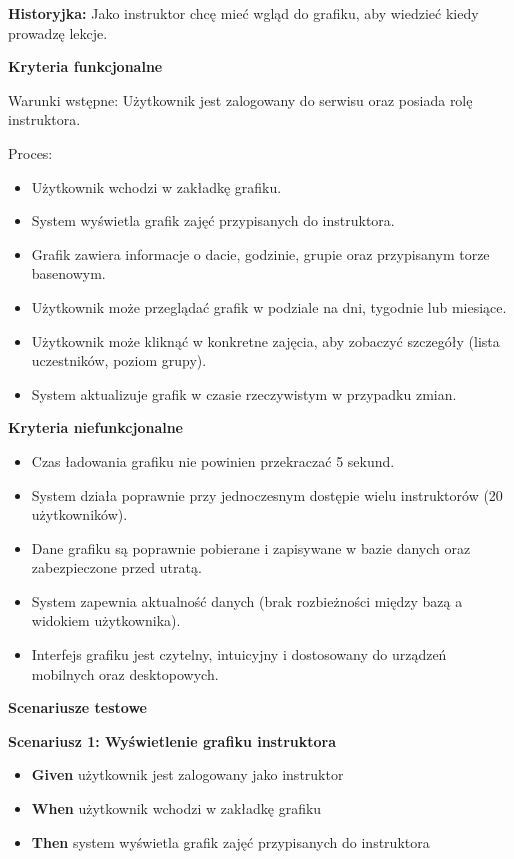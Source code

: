 \documentclass[a4paper,12pt]{article}
\begin{document}
\noindent \textbf{Historyjka:} Jako instruktor chcę mieć wgląd do grafiku, aby wiedzieć kiedy prowadzę lekcje.

\vspace{0,2cm}

\noindent \textbf{Kryteria funkcjonalne}

\vspace{0,2cm}

\noindent Warunki wstępne: Użytkownik jest zalogowany do serwisu oraz posiada rolę instruktora.

\vspace{0,2cm}

\noindent Proces:

\begin{itemize}
    \item Użytkownik wchodzi w zakładkę grafiku.
    \item System wyświetla grafik zajęć przypisanych do instruktora.
    \item Grafik zawiera informacje o dacie, godzinie, grupie oraz przypisanym torze basenowym.
    \item Użytkownik może przeglądać grafik w podziale na dni, tygodnie lub miesiące.
    \item Użytkownik może kliknąć w konkretne zajęcia, aby zobaczyć szczegóły (lista uczestników, poziom grupy).
    \item System aktualizuje grafik w czasie rzeczywistym w przypadku zmian.
\end{itemize}

\noindent \textbf{Kryteria niefunkcjonalne}
\begin{itemize}
    \item Czas ładowania grafiku nie powinien przekraczać 5 sekund.
    \item System działa poprawnie przy jednoczesnym dostępie wielu instruktorów (20  użytkowników).
    \item Dane grafiku są poprawnie pobierane i zapisywane w bazie danych oraz zabezpieczone przed utratą.
    \item System zapewnia aktualność danych (brak rozbieżności między bazą a widokiem użytkownika).
    \item Interfejs grafiku jest czytelny, intuicyjny i dostosowany do urządzeń mobilnych oraz desktopowych.
\end{itemize}

\noindent \textbf{Scenariusze testowe}

\textbf{Scenariusz 1: Wyświetlenie grafiku instruktora}
\begin{itemize}
    \item \textbf{Given} użytkownik jest zalogowany jako instruktor
    \item \textbf{When} użytkownik wchodzi w zakładkę grafiku
    \item \textbf{Then} system wyświetla grafik zajęć przypisanych do instruktora
\end{itemize}
\end{document}
